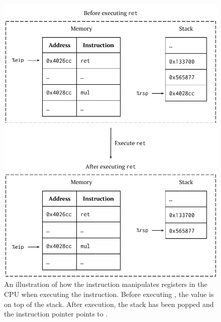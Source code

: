 \begin{figure}[H]
  \centering
  \includegraphics{figures/ret-example.pdf}
  \caption{An illustration of how the  instruction manipulates registers in the CPU when executing the  instruction. Before executing , the value  is on top of the stack. After execution, the stack has been popped and the instruction pointer points to .}
  \label{fig:ret}
\end{figure}
